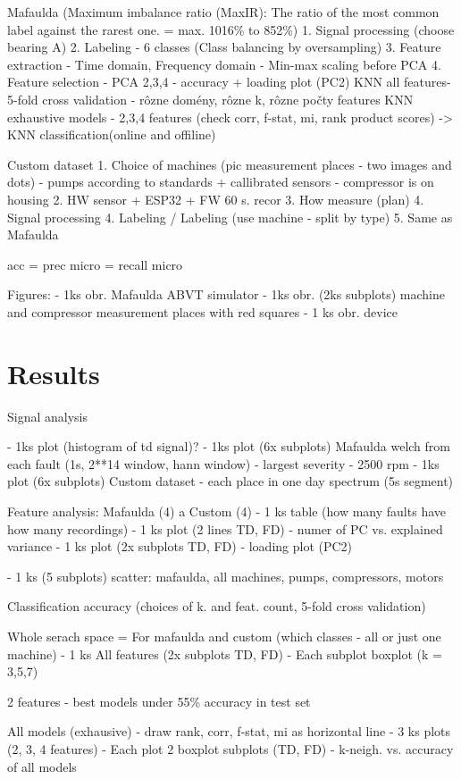 \documentclass{llncs}
\begin{document}
Mafaulda (Maximum imbalance ratio (MaxIR): The ratio of the most common label against the rarest one. = max. 1016\% to 852\%)
1. Signal processing (choose bearing A)
2. Labeling - 6 classes (Class balancing by oversampling)
3. Feature extraction - Time domain, Frequency domain - Min-max scaling before PCA
4. Feature selection - 
	PCA 2,3,4 - accuracy + loading plot (PC2)
	KNN all features- 5-fold cross validation - rôzne domény, rôzne k, rôzne počty features
	KNN exhaustive models - 
		2,3,4 features (check corr, f-stat, mi, rank product scores)
	 -> KNN classification(online and offiline)

Custom dataset
1. Choice of machines (pic measurement places - two images and dots) - pumps according to standards + callibrated sensors
	- compressor is on housing
2. HW sensor + ESP32 + FW 60 s. recor
3. How measure (plan)
4. Signal processing
4. Labeling  / Labeling (use machine - split by type) 
5. Same as Mafaulda

acc = prec micro = recall micro


Figures:
- 1ks obr. Mafaulda ABVT simulator
- 1ks obr. (2ks subplots) machine and compressor measurement places with red squares
- 1 ks obr. device


\section{Results}
Signal analysis

- 1ks plot (histogram of td signal)?
- 1ks plot (6x subplots) Mafaulda welch from each fault (1s, 2**14 window, hann window)  - largest severity - 2500 rpm
- 1ks plot (6x subplots) Custom dataset - each place in one day spectrum (5s segment)

Feature analysis:
Mafaulda (4) a Custom (4) 
- 1 ks table (how many faults have how many recordings)
- 1 ks plot (2 lines TD, FD) - numer of PC vs. explained variance
- 1 ks plot (2x subplots TD, FD) - loading plot (PC2)

- 1 ks (5 subplots) scatter: mafaulda, all machines, pumps, compressors, motors


Classification accuracy (choices of k. and feat. count, 5-fold cross validation)

Whole serach space = For mafaulda and custom (which classes - all or just one machine)
- 1 ks All features (2x subplots TD, FD)
	- Each subplot boxplot (k = 3,5,7)

2 features - best models under 55\% accuracy in test set

All models (exhausive) - draw rank, corr, f-stat, mi as horizontal line
	- 3 ks plots (2, 3, 4 features)
		- Each plot 2 boxplot subplots (TD, FD) - k-neigh. vs. accuracy of all models
\end{document}
